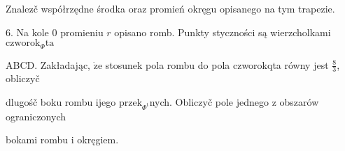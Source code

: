 \documentclass[a4paper,12pt]{article}
\begin{document}
Znalez$\acute{}$č współrzędne środka oraz promień okręgu opisanego na tym trapezie.

6. Na kole $0$ promieniu $r$ opisano romb. Punkty styczności są wierzcholkami $\mathrm{c}\mathrm{z}\mathrm{w}\mathrm{o}\mathrm{r}\mathrm{o}\mathrm{k}_{\Phi}\mathrm{t}\mathrm{a}$

ABCD. Zakładając, $\dot{\mathrm{z}}\mathrm{e}$ stosunek pola rombu do pola czworokqta równy jest $\displaystyle \frac{8}{3}$, obliczyč

dlugośč boku rombu ijego $\mathrm{p}\mathrm{r}\mathrm{z}\mathrm{e}\mathrm{k}_{\Phi^{\mathrm{t}}}$nych. Obliczyč pole jednego $\mathrm{z}$ obszarów ograniczonych

bokami rombu $\mathrm{i}$ okręgiem.
\end{document}
